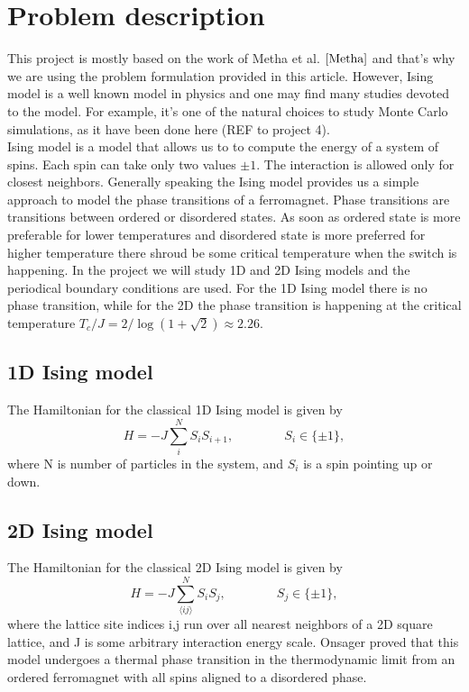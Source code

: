 \documentclass[10pt]{article}
\begin{document}
\section{Problem description}
This project is mostly based on the work of Metha et al. $\cite{Metha}$ and that's why we are using the problem formulation provided in this article. However, Ising model is a well known model in physics and one may find many studies devoted to the model. For example, it's one of the natural choices to study Monte Carlo simulations, as it have been done here (REF to project 4).\\
Ising model is a model that allows us to to compute the energy of a system of spins. Each spin can take only two values $\pm1$. The interaction is allowed only for closest neighbors. Generally speaking the Ising model provides us a simple approach to model the phase transitions of a ferromagnet. Phase transitions are transitions between ordered or disordered states. As soon as ordered state is more preferable for lower temperatures and disordered state is more preferred for higher temperature there shroud be some critical temperature when the switch is happening. In the project we will study 1D and 2D Ising models and the periodical boundary conditions are used. For the 1D Ising model there is no phase transition, while for the 2D the phase transition is happening at the critical temperature  $T_c/J=2/\log(1+\sqrt{2})\approx 2.26$. 
\subsection{1D Ising model}
The Hamiltonian for the classical 1D Ising model is given by
\begin{equation}
H = -J\sum_{i}^N S_{i}S_{i+1},\qquad \qquad S_i\in\{\pm 1\},
\end{equation}
where N is number of particles in the system, and $S_i$ is a spin pointing up or down. \\

\subsection{2D Ising model}
The Hamiltonian for the classical 2D Ising model is given by
\begin{equation}
H = -J\sum_{\langle ij\rangle}^N S_{i}S_j,\qquad \qquad S_j\in\{\pm 1\},
\end{equation}
where the lattice site indices i,j run over all nearest neighbors of a 2D square lattice, and J is some arbitrary interaction energy scale. Onsager proved that this model undergoes a thermal phase transition in the thermodynamic limit from an ordered ferromagnet with all spins aligned to a disordered phase. \\
\end{document}
